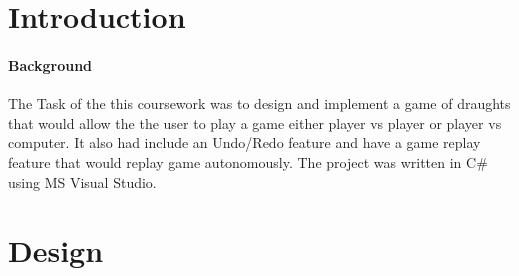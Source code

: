 \documentclass[10pt, a4paper]{article}
\title{\mytitle}
\author{\myauthor\hspace{1em}\\\contact\\Edinburgh Napier University\hspace{0.5em}-\hspace{0.5em}\mymodule}
\date{}
\begin{document}
    \maketitle
    \begin{abstract}
       The objective of this coursework was to demonstrate understanding of Algorithms and Data Structures and apply it to a real world project. The task was to implement a game of draughts with various additional features.
    \end{abstract}
    
    
    
    \section{Introduction}
    \paragraph{Background}
    The Task of the this coursework was to design and implement a game of draughts that would allow the the user to play a game either player vs player or player vs computer. It also had include an Undo/Redo feature and have a game replay feature that would replay game autonomously. The project was written in C\# using MS Visual Studio.
    
   
	
	\section{Design}
\end{document}
